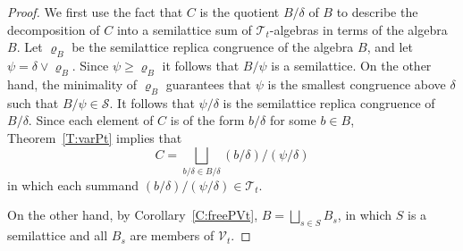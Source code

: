 \documentclass[10pt,a4paper]{amsart}
\newcommand{\mcS}{\mathcal{S}}
\newcommand{\mcT}{\mathcal{T}}
\newcommand{\mcV}{\mathcal{V}}
\begin{document}
\begin{proof}
We first use the fact that $C$ is the quotient $B/\delta$ of $B$ to describe the
decomposition of $C$ into a semilattice sum of $\mcT_t$-algebras in terms of
the algebra $B$.
Let $\varrho_B$ be the semilattice replica congruence of the algebra $B$, and let
$\psi = \delta \vee \varrho_B$. Since $\psi \geq \varrho_B$ it follows that $B/\psi$ is a
semilattice. On the other hand, the minimality of $\varrho_B$ guarantees that $\psi$ is
the smallest congruence above $\delta$ such that $B/\psi \in \mcS$. It follows that
$\psi/\delta$ is the semilattice replica congruence of $B/\delta$.
Since each element of $C$ is of the form $b/\delta$ for some $b\in B$,
Theorem~\ref{T:varPt} implies that
\begin{equation*}
  C = \bigsqcup_{b/\delta\in B/\delta} (b/\delta)/(\psi/\delta)
\end{equation*}
in which each summand $(b/\delta)/(\psi/\delta) \in \mcT_t$.


On the other hand, by Corollary~\ref{C:freePVt}, $B = \bigsqcup_{s \in S} B_s $, in which
$S$ is a semilattice and all $B_s$ are members of $\mcV_t$.


\end{proof}
\end{document}

